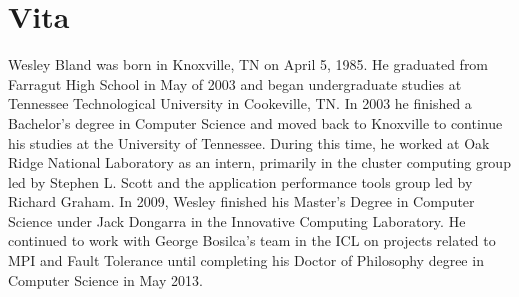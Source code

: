 \chapter*{Vita} \label{ch:vita}

Wesley Bland was born in Knoxville, TN on April 5, 1985. He graduated from 
Farragut High School in May of 2003 and began undergraduate studies at Tennessee 
Technological University in Cookeville, TN. In 2003 he finished a Bachelor's 
degree in Computer Science and moved back to Knoxville to continue his studies 
at the University of Tennessee. During this time, he worked at Oak Ridge National 
Laboratory as an intern, primarily in the cluster computing group led by Stephen 
L. Scott and the application performance tools group led by Richard Graham. In 
2009, Wesley finished his Master's Degree in Computer Science under Jack Dongarra 
in the Innovative Computing Laboratory. He continued to work with George 
Bosilca's team in the ICL on projects related to MPI and Fault Tolerance until 
completing his Doctor of Philosophy degree in Computer Science in May 2013.